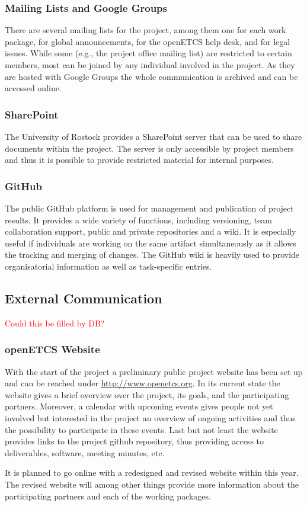 \subsubsection{Mailing Lists and Google Groups}

There are several mailing lists for the project, among them one for each work package, for global announcements, for the openETCS help desk, and for legal issues. While some (e.g., the project office mailing list) are restricted to certain members, most can be joined by any individual involved in the project. As they are hosted with Google Groups the whole communication is archived and can be accessed online.

\subsubsection{SharePoint}

The University of Rostock provides a SharePoint server that can be used to share documents within the project. The server is only accessible by project members and thus it is possible to provide restricted material for internal purposes.

\subsubsection{GitHub}

The public GitHub platform is used for management and publication of project results. It provides a wide variety of functions, including versioning, team collaboration support, public and private repositories and a wiki. It is especially useful if individuals are working on the same artifact simultaneously as it allows the tracking and merging of changes. The GitHub wiki is heavily used to provide organisatorial information as well as task-specific entries.

\subsection{External Communication}
\textcolor{red}{Could this be filled by DB?}

\subsubsection{openETCS Website}
With the start of the project a preliminary public project website has been set up and can be reached under \url{http://www.openetcs.org}. In its current state the website gives a brief overview over the project, its goals, and the participating partners. Moreover, a calendar with upcoming events gives people not yet involved but interested in the project an overview of ongoing activities and thus the possibility to participate in these events. Last but not least the website provides links to the project github repository, thus providing access to deliverables, software, meeting minutes, etc.

It is planned to go online with a redesigned and revised website within this year. The revised website will among other things provide more information about the participating partners and each of the working packages.

